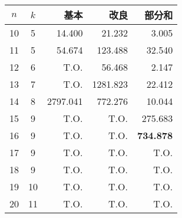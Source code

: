  \centering 
 \begin{tabular}{c|c|r|r|r} %
  $n$ & $k$ & 基本 & 改良 & 部分和 \\ \hline
  10 & 5 & 14.400 & 21.232 & 3.005 \\
  11 & 5 & 54.674 & 123.488 & 32.540 \\
  12 & 6 & T.O. & 56.468 & 2.147 \\
  13 & 7 & T.O. & 1281.823 & 22.412 \\  
  14 & 8 & 2797.041 & 772.276 & 10.044 \\   
  15 & 9 & T.O. & T.O. & 275.683 \\  
  16 & 9 & T.O. & T.O. & \alert{\textbf{734.878}} \\
  17 & 9 & T.O. & T.O. & T.O. \\
  18 & 9 & T.O. & T.O. & T.O. \\
  19 & 10 & T.O. & T.O. & T.O. \\
  20 & 11 & T.O. & T.O. & T.O. \\ %
 \end{tabular}